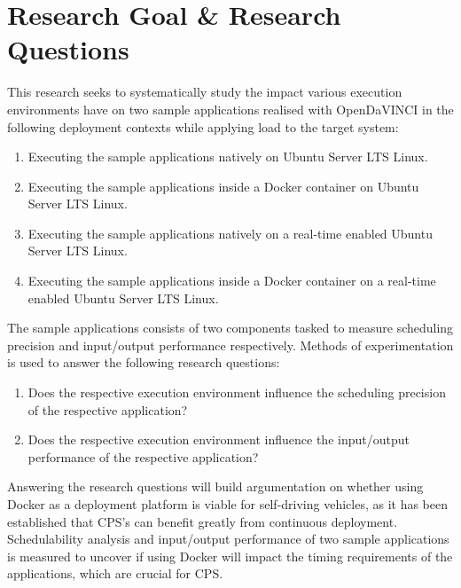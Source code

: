 \section{Research Goal \& Research Questions}

This research seeks to systematically study the impact various execution environments have on two sample applications realised with OpenDaVINCI in the following deployment contexts while applying load to the target system:\\ 

\begin{enumerate}
\item Executing the sample applications natively on Ubuntu Server LTS Linux.
\item Executing the sample applications inside a Docker container on Ubuntu Server LTS Linux.
\item Executing the sample applications natively on a real-time enabled Ubuntu Server LTS Linux.
\item Executing the sample applications inside a Docker container on a real-time enabled Ubuntu Server LTS Linux.\\
\end{enumerate}

The sample applications consists of two components tasked to measure scheduling precision and input/output performance respectively. 
Methods of experimentation is used to answer the following research questions:\\

\begin{enumerate}[label=\textbf{RQ\arabic*}]
\label{section:rqs}
	\item Does the respective execution environment influence the scheduling precision of the respective application?
	\item Does the respective execution environment influence the input/output performance of the respective application?\\
\end{enumerate}

Answering the research questions will build argumentation on whether using Docker as a deployment platform is viable for self-driving vehicles, as it has been established that CPS's can benefit greatly from continuous deployment. Schedulability analysis and input/output performance of two sample applications is measured to uncover if using Docker will impact the timing requirements of the applications, which are crucial for CPS.



